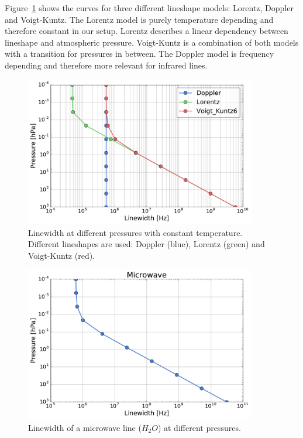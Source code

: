 \documentclass[paper=a4, fontsize=11pt]{scrartcl} %
\begin{document}
Figure~\ref{fig:lineshapes} shows the curves for three different lineshape 
models: Lorentz, Doppler and Voigt-Kuntz. The Lorentz model is purely 
temperature depending and therefore constant in our setup. Lorentz describes a 
linear dependency between lineshape and atmospheric pressure. Voigt-Kuntz is a 
combination of both models with a transition for pressures in between. The 
Doppler model is frequency depending and therefore more relevant for infrared 
lines.
\vfill
\begin{figure}[ht]
  \includegraphics[width=0.9\textwidth]{plots/linewidth.pdf}
  \caption{Linewidth at different pressures with constant temperature.
  Different lineshapes are used: Doppler (blue), Lorentz (green)
  and Voigt-Kuntz (red).}
  \label{fig:lineshapes}
\end{figure}

\begin{figure}[ht]
  \includegraphics[width=0.9\textwidth]{plots/mw_linewidth.pdf}
  \caption{Linewidth of a microwave line ($H_2O$) at different pressures.}
  \label{fig:mw_linewidth}
\end{figure}
\end{document}
